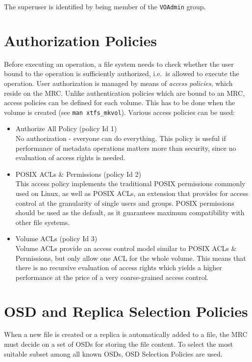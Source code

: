 \documentclass[a4paper,10pt]{book}
\begin{document}
The superuser is identified by being member of the \texttt{VOAdmin} group.


\section{Authorization Policies} \label{sec:access_policies}
Before executing an operation, a file system needs to check whether the user bound to the operation is sufficiently authorized, i.e.\ is allowed to execute the operation. User authorization is managed by means of \emph{access policies}, which reside on the MRC. Unlike authentication policies which are bound to an MRC, access policies can be defined for each volume. This has to be done when the volume is created (see \texttt{man xtfs\_mkvol}). Various access policies can be used: 

\begin{itemize}
 \item Authorize All Policy (policy Id 1)\\
No authorization - everyone can do everything. This policy is useful if performance of metadata operations matters more than security, since no evaluation of access rights is needed.

 \item POSIX ACLs \& Permissions (policy Id 2)\\
This access policy implements the traditional POSIX permissions commonly used on Linux, as well as POSIX ACLs, an extension that provides for access control at the granularity of single users and groups. POSIX permissions should be used as the default, as it guarantees maximum compatibility with other file systems.

 \item Volume ACLs (policy Id 3)\\
Volume ACLs provide an access control model similar to POSIX ACLs \& Permissions, but only allow one ACL for the whole volume. This means that there is no recursive evaluation of access rights which yields a higher performance at the price of a very coarse-grained access control. 
\end{itemize}


\section{OSD and Replica Selection Policies} \label{sec:osd_policies}
When a new file is created or a replica is automatically added to a file, the MRC must decide on a set of OSDs for storing the file content. To select the most suitable subset among all known OSDs, OSD Selection Policies are used.
\end{document}
